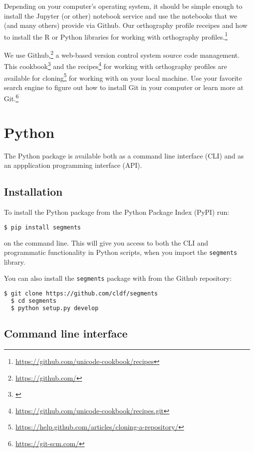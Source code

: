 Depending on your computer's operating system, it should be simple enough to install the Jupyter (or other) notebook service and use the notebooks that we (and many others) provide via Github. Our orthography profile receipes and how to install the R or Python libraries for working with orthography profiles.\footnote{\url{https://github.com/unicode-cookbook/recipes}}

We use Github,\footnote{\url{https://github.com/}} a web-based version control system source code management. This cookbook\footnote{\url{}} and the recipes\footnote{\url{https://github.com/unicode-cookbook/recipes.git}} for working with orthography profiles are available for cloning\footnote{\url{https://help.github.com/articles/cloning-a-repository/}} for working with on your local machine. Use your favorite search engine to figure out how to install Git in your computer or learn more at Git.\footnote{\url{https://git-scm.com/}}



\section{Python}
\label{python-implementations}

The Python package is available both as a command line interface (CLI) 
and as an appplication programming interface (API).

\subsection*{Installation}

To install the Python package from the Python Package Index (PyPI) run:

\begin{lstlisting}[language=bash]
  $ pip install segments
\end{lstlisting}

\noindent on the command line. This will give you access to both 
the CLI and programmatic functionality in Python scripts, when 
you import the \texttt{segments} library.

You can also install the \texttt{segments} 
package with from the Github repository:

\begin{lstlisting}[language=bash]
  $ git clone https://github.com/cldf/segments
  $ cd segments
  $ python setup.py develop
\end{lstlisting}


\subsection*{Command line interface}

